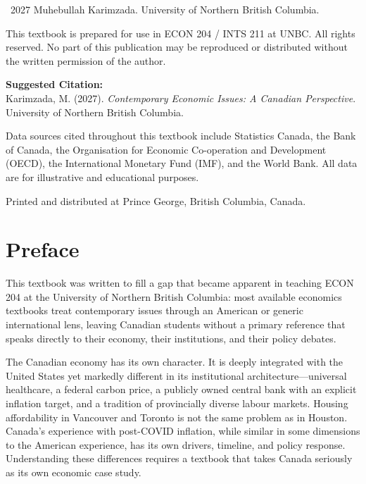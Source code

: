\documentclass[12pt,twoside,openright]{book}
\theoremstyle{definition}
\begin{document}
\newpage
\thispagestyle{empty}
\vspace*{\fill}
\begin{small}
\noindent\textcopyright\ 2027 Muhebullah Karimzada. University of Northern British Columbia.

\vspace{8pt}
\noindent This textbook is prepared for use in ECON 204 / INTS 211 at UNBC. All rights reserved.
No part of this publication may be reproduced or distributed without the written permission
of the author.

\vspace{8pt}
\noindent\textbf{Suggested Citation:}\\
Karimzada, M. (2027). \textit{Contemporary Economic Issues: A Canadian Perspective}.
University of Northern British Columbia.

\vspace{8pt}
\noindent Data sources cited throughout this textbook include Statistics Canada, the Bank of Canada,
the Organisation for Economic Co-operation and Development (OECD), the International Monetary
Fund (IMF), and the World Bank. All data are for illustrative and educational purposes.

\vspace{8pt}
\noindent Printed and distributed at Prince George, British Columbia, Canada.
\end{small}
\vspace*{\fill}

\chapter*{Preface}

\noindent This textbook was written to fill a gap that became apparent in teaching ECON 204 at the University
of Northern British Columbia: most available economics textbooks treat contemporary issues through
an American or generic international lens, leaving Canadian students without a primary reference
that speaks directly to their economy, their institutions, and their policy debates.

The Canadian economy has its own character. It is deeply integrated with the United States yet
markedly different in its institutional architecture---universal healthcare, a federal carbon price,
a publicly owned central bank with an explicit inflation target, and a tradition of provincially
diverse labour markets. Housing affordability in Vancouver and Toronto is not the same problem
as in Houston. Canada's experience with post-COVID inflation, while similar in some dimensions
to the American experience, has its own drivers, timeline, and policy response. Understanding
these differences requires a textbook that takes Canada seriously as its own economic case study.
\end{document}
